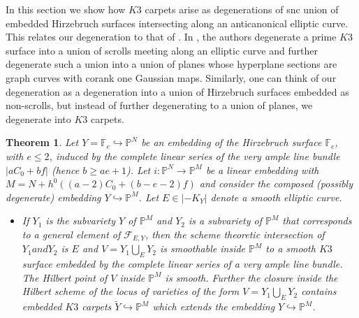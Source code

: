 \documentclass[11pt,twoside]{amsart}
\theoremstyle{plain}
\numberwithin{equation}{section}
\newtheorem{theorem}{Theorem}[section]
\theoremstyle{definition}
\begin{document}
In this section we show how $K3$ carpets arise as degenerations of snc union of embedded Hirzebruch surfaces intersecting along an anticanonical elliptic curve. This relates our degeneration to that of \cite{CLM93}. In \cite{CLM93}, the authors degenerate a prime $K3$ surface into a union of scrolls meeting along an elliptic curve and further degenerate such a union into a union of planes whose hyperplane sections are graph curves with corank one Gaussian maps. Similarly, one can think of our degeneration as a degeneration into a union of Hirzebruch surfaces embedded as non-scrolls, but instead of further degenerating to a union of planes, we degenerate into $K3$ carpets.

\begin{theorem}\label{Hirzebruch main}
Let $Y = \mathbb{F}_e \hookrightarrow \mathbb{P}^N$ be an embedding of the Hirzebruch surface $\mathbb{F}_e$, with $e \leq 2$, induced by the complete linear series of the very ample line bundle $|aC_0+bf|$ (hence $b \geq ae+1$). Let $i: \mathbb{P}^N \to \mathbb{P}^M$ be a linear embedding with $M = N + h^0((a-2)C_0+(b-e-2)f)$ and consider the composed (possibly degenerate) embedding $Y \hookrightarrow \mathbb{P}^M$. Let $E \in |-K_Y|$ denote a smooth elliptic curve.
\begin{itemize}
    \item[(1)] If $Y_1$ is the subvariety $Y$ of $\mathbb P^M$ and $Y_2$ is a subvariety of $\mathbb P^M$ that corresponds to a general element of $\mathcal{F}_{E,Y}$, then {the scheme theoretic intersection of $Y_1 and Y_2$ is $E$ and} {$V = Y_1 \bigcup_E Y_2$} is  smoothable inside $\mathbb{P}^M$ to a \textit{smooth $K3$ surface} embedded by the complete linear series of a very ample line bundle. The Hilbert point of $V$ inside $\mathbb{P}^M$ is smooth. 
     Further the closure inside the Hilbert scheme of the locus of varieties of the form $V = Y_1 \bigcup_E Y_2$ contains embedded $K3$ carpets $\widetilde{Y} \hookrightarrow \mathbb{P}^M$ which extends the embedding $Y \hookrightarrow \mathbb{P}^M$.  
    

\end{itemize}
\end{theorem}
\end{document}
